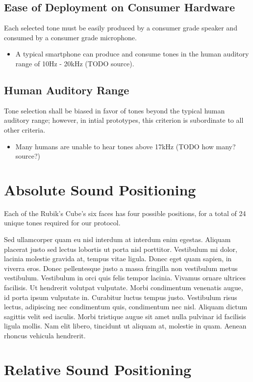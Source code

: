 \subsection{Ease of Deployment on Consumer Hardware}
Each selected tone must be easily produced by a consumer grade speaker and consumed by a consumer grade microphone.
\begin{itemize}
    \item A typical smartphone can produce and consume tones in the human auditory range of 10Hz - 20kHz (TODO source).
\end{itemize}

\subsection{Human Auditory Range}
Tone selection shall be biased in favor of tones beyond the typical human auditory range; however, in intial prototypes, this criterion is subordinate to all other criteria.
\begin{itemize}
    \item Many humans are unable to hear tones above 17kHz (TODO how many? source?)
\end{itemize}


\section{Absolute Sound Positioning}

Each of the Rubik's Cube's six faces has four possible positions, for a total of 24 unique tones required for our protocol.

Sed ullamcorper quam eu nisl interdum at interdum enim egestas. Aliquam placerat justo sed lectus lobortis ut porta nisl porttitor. Vestibulum mi dolor, lacinia molestie gravida at, tempus vitae ligula. Donec eget quam sapien, in viverra eros. Donec pellentesque justo a massa fringilla non vestibulum metus vestibulum. Vestibulum in orci quis felis tempor lacinia. Vivamus ornare ultrices facilisis. Ut hendrerit volutpat vulputate. Morbi condimentum venenatis augue, id porta ipsum vulputate in. Curabitur luctus tempus justo. Vestibulum risus lectus, adipiscing nec condimentum quis, condimentum nec nisl. Aliquam dictum sagittis velit sed iaculis. Morbi tristique augue sit amet nulla pulvinar id facilisis ligula mollis. Nam elit libero, tincidunt ut aliquam at, molestie in quam. Aenean rhoncus vehicula hendrerit.


\section{Relative Sound Positioning}

